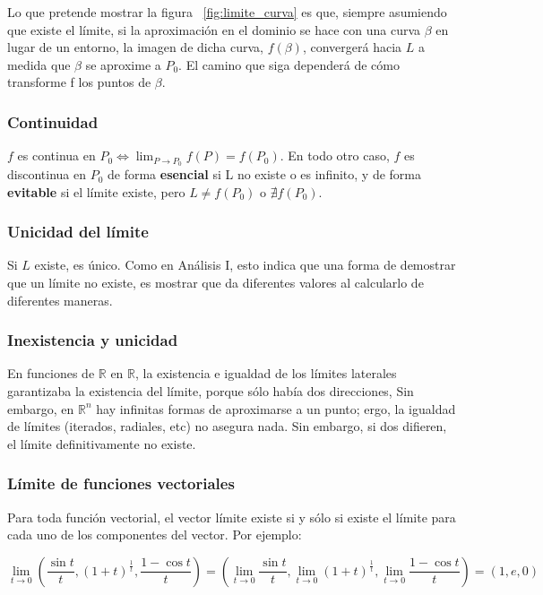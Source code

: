 \documentclass{article}
\renewcommand{\Bbb}{\mathbb}
\begin{document}
Lo que pretende mostrar la figura ~\ref{fig:limite_curva} es que, siempre asumiendo que existe el límite, si la aproximación en el dominio se hace con una curva $\beta$ en lugar de un entorno, la imagen de dicha curva, $f(\beta)$, convergerá hacia $L$ a medida que $\beta$ se aproxime a $P_0$. El camino que siga dependerá de cómo transforme f los puntos de $\beta$.

\subsubsection{Continuidad}

$f$ es continua en $P_0 \Longleftrightarrow \displaystyle{\lim_{P \rightarrow P_0}} f(P) = f(P_0)$. En todo otro caso, $f$ es discontinua en $P_0$ de forma \textbf{esencial} si L no existe o es infinito, y de forma \textbf{evitable} si el límite existe, pero $L \neq f(P_0)$ o $\nexists f(P_0)$.

\subsubsection{Unicidad del límite}

Si $L$ existe, es único. Como en Análisis I, esto indica que una forma de demostrar que un límite no existe, es mostrar que da diferentes valores al calcularlo de diferentes maneras.

\subsubsection{Inexistencia y unicidad}

En funciones de $\Bbb R$ en $\Bbb R$, la existencia e igualdad de los límites laterales garantizaba la existencia del límite, porque sólo había dos direcciones, Sin embargo, en $\Bbb R^n$ hay infinitas formas de aproximarse a un punto; ergo, la igualdad de límites (iterados, radiales, etc) no asegura nada. Sin embargo, si dos difieren, el límite definitivamente no existe.

\subsubsection{Límite de funciones vectoriales}

Para toda función vectorial, el vector límite existe si y sólo si existe el límite para cada uno de los componentes del vector. Por ejemplo:

\begin{equation}
\lim_{t \rightarrow 0} \left( \frac{\sin t}{t}, (1 + t)^\frac{1}{t}, \frac{1-\cos t}{t} \right) = \left( \lim_{t \rightarrow 0} \frac{\sin t}{t}, \lim_{t \rightarrow 0} (1 + t)^\frac{1}{t}, \lim_{t \rightarrow 0} \frac{1-\cos t}{t} \right) = (1, e, 0)
\end{equation}
\end{document}
